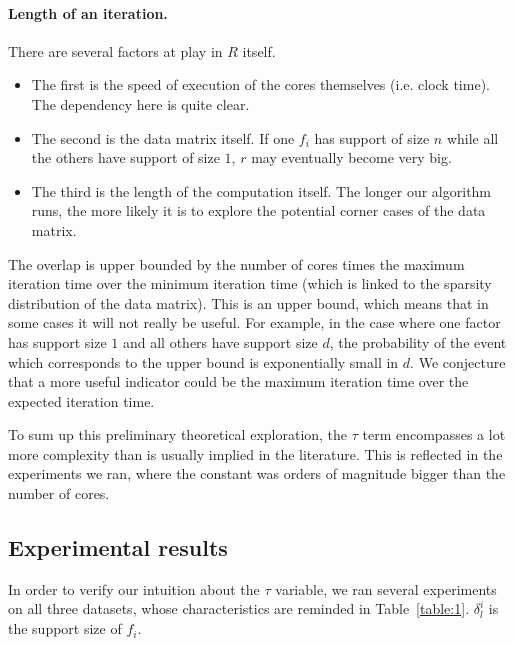 \documentclass[twoside]{article}
\newcommand{\overlap}{\tau}
\begin{document}
\paragraph{Length of an iteration.} 
There are several factors at play in $R$ itself. 
\begin{itemize}
\item The first is the speed of execution of the cores themselves (i.e. clock time). 
The dependency here is quite clear.

\item The second is the data matrix itself. If one $f_i$ has support of size $n$ while all the others have support of size $1$, $r$ may eventually become very big.

\item The third is the length of the computation itself. The longer our algorithm runs, the more likely it is to explore the potential corner cases of the data matrix.
\end{itemize}

The overlap is upper bounded by the number of cores times the maximum iteration time over the minimum iteration time (which is linked to the sparsity distribution of the data matrix).
This is an upper bound, which means that in some cases it will not really be useful. 
For example, in the case where one factor has support size $1$ and all others have support size $d$, the probability of the event which corresponds to the upper bound is exponentially small in $d$. 
We conjecture that a more useful indicator could be the maximum iteration time over the expected iteration time.

To sum up this preliminary theoretical exploration, the $\overlap$ term encompasses a lot more complexity than is usually implied in the literature. 
This is reflected in the experiments we ran, where the constant was orders of magnitude bigger than the number of cores.

\subsection{Experimental results}
In order to verify our intuition about the $\overlap$ variable, we ran several experiments on all three datasets, whose characteristics are reminded in Table~\ref{table:1}.
$\delta_l^i$ is the support size of $f_i$.
\end{document}
